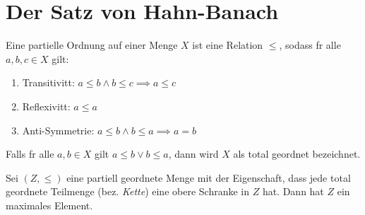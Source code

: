 \section{Der Satz von Hahn-Banach}
\begin{definition}
	Eine partielle Ordnung auf einer Menge $X$ ist eine Relation $\leq$, sodass f\us r alle \(a,b,c \in X\) gilt:
	\begin{enumerate}[noitemsep]
		\item Transitivit\as t: \(a\leq b \land b \leq c \implies a\leq c\)
		\item Reflexivit\as t: \(a\leq a\)
		\item Anti-Symmetrie: \(a\leq b \land b\leq a \implies a = b\)	
	\end{enumerate}
	Falls f\us r alle \(a,b \in X\) gilt \(a\leq b \lor b \leq a\), dann wird $X$ als total geordnet bezeichnet.
\end{definition}
\begin{theorem}
	Sei \((Z, \leq)\) eine partiell geordnete Menge mit der Eigenschaft, dass jede total geordnete Teilmenge (bez. \textit{Kette}) eine obere Schranke in $Z$ hat. Dann hat $Z$ ein maximales Element. 
	\end{theorem}
	
